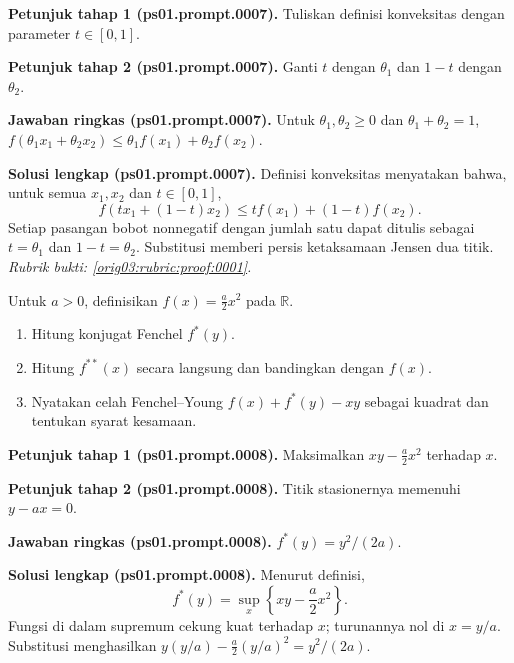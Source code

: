 \par\noindent\textbf{Petunjuk tahap 1 (ps01.prompt.0007).}
Tuliskan definisi konveksitas dengan parameter $t\in[0,1]$.
\label{orig03:ps01:hint1:0007}
\par\noindent\textbf{Petunjuk tahap 2 (ps01.prompt.0007).}
Ganti $t$ dengan $\theta_1$ dan $1-t$ dengan $\theta_2$.
\label{orig03:ps01:hint2:0007}
\par\noindent\textbf{Jawaban ringkas (ps01.prompt.0007).}
Untuk $\theta_1,\theta_2\geq0$ dan $\theta_1+\theta_2=1$,
$f(\theta_1x_1+\theta_2x_2)\leq\theta_1f(x_1)+\theta_2f(x_2)$.
\label{orig03:ps01:answer:0007}
\par\noindent\textbf{Solusi lengkap (ps01.prompt.0007).}
Definisi konveksitas menyatakan bahwa, untuk semua $x_1,x_2$ dan
$t\in[0,1]$,
\[
 f(tx_1+(1-t)x_2)\leq t f(x_1)+(1-t)f(x_2).
\]
Setiap pasangan bobot nonnegatif dengan jumlah satu dapat ditulis sebagai
$t=\theta_1$ dan $1-t=\theta_2$. Substitusi memberi persis ketaksamaan Jensen
dua titik.
\emph{Rubrik bukti: \ref{orig03:rubric:proof:0001}.}
\label{orig03:ps01:solution:0007}

\begin{exercise}
\label{orig03:ps01:problem:0004}
Untuk $a>0$, definisikan $f(x)=\tfrac a2x^2$ pada $\mathbb{R}$.
\begin{enumerate}
\item\label{orig03:ps01:prompt:0008}
Hitung konjugat Fenchel $f^*(y)$.
\item\label{orig03:ps01:prompt:0009}
Hitung $f^{**}(x)$ secara langsung dan bandingkan dengan $f(x)$.
\item\label{orig03:ps01:prompt:0010}
Nyatakan celah Fenchel--Young $f(x)+f^*(y)-xy$ sebagai kuadrat dan tentukan
syarat kesamaan.
\end{enumerate}
\end{exercise}

\par\noindent\textbf{Petunjuk tahap 1 (ps01.prompt.0008).}
Maksimalkan $xy-\tfrac a2x^2$ terhadap $x$.
\label{orig03:ps01:hint1:0008}
\par\noindent\textbf{Petunjuk tahap 2 (ps01.prompt.0008).}
Titik stasionernya memenuhi $y-ax=0$.
\label{orig03:ps01:hint2:0008}
\par\noindent\textbf{Jawaban ringkas (ps01.prompt.0008).}
$f^*(y)=y^2/(2a)$.
\label{orig03:ps01:answer:0008}
\par\noindent\textbf{Solusi lengkap (ps01.prompt.0008).}
Menurut definisi,
\[
 f^*(y)=\sup_x\left\{xy-\frac a2x^2\right\}.
\]
Fungsi di dalam supremum cekung kuat terhadap $x$; turunannya nol di
$x=y/a$. Substitusi menghasilkan
$y(y/a)-\tfrac a2(y/a)^2=y^2/(2a)$.
\label{orig03:ps01:solution:0008}


